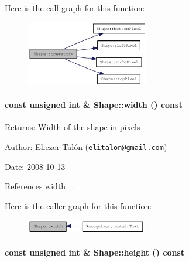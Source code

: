 Here is the call graph for this function:\nopagebreak
\begin{figure}[H]
\begin{center}
\leavevmode
\includegraphics[width=152pt]{class_shape_183a6bc428172ced8122ffb68d0f04ef_cgraph}
\end{center}
\end{figure}
\hypertarget{class_shape_6773dfedb96ef750e5469e22d51ecf0f}{
\paragraph[width]{\setlength{\rightskip}{0pt plus 5cm}const unsigned int \& Shape::width () const}\hfill}
\label{class_shape_6773dfedb96ef750e5469e22d51ecf0f}


\begin{Desc}
\item[Returns:]Width of the shape in pixels\end{Desc}
\begin{Desc}
\item[Author:]Eliezer Talón (\href{mailto:elitalon@gmail.com}{\tt elitalon@gmail.com}) \end{Desc}
\begin{Desc}
\item[Date:]2008-10-13 \end{Desc}


References width\_\-.

Here is the caller graph for this function:\nopagebreak
\begin{figure}[H]
\begin{center}
\leavevmode
\includegraphics[width=149pt]{class_shape_6773dfedb96ef750e5469e22d51ecf0f_icgraph}
\end{center}
\end{figure}
\hypertarget{class_shape_8400155046b2190bce621f8f366ef2be}{
\paragraph[height]{\setlength{\rightskip}{0pt plus 5cm}const unsigned int \& Shape::height () const}\hfill}
\label{class_shape_8400155046b2190bce621f8f366ef2be}


